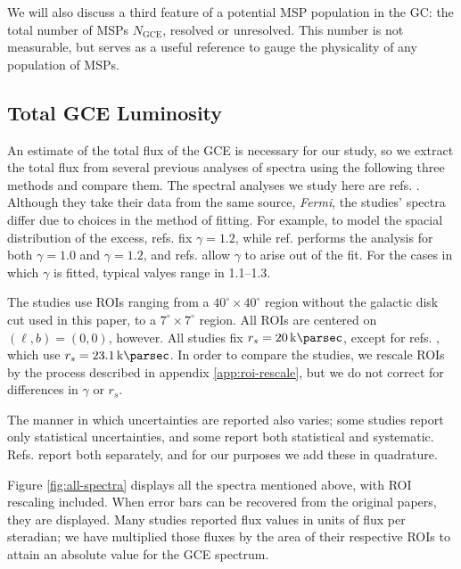 \documentclass[a4paper,11pt]{article}
\newcommand{\comment}[1]{\emph{\color{red}{#1}}}
\begin{document}
We will also discuss a third feature of a potential MSP population in the GC: the total number of MSPs $N_\text{GCE}$, resolved or unresolved. This number is not measurable, but serves as a useful reference to gauge the physicality of any population of MSPs. \comment{Mention that it's expected to be around 40,000.}


\subsection{Total GCE Luminosity}
\label{sec:total-lum}
An estimate of the total flux of the GCE is necessary for our study, so we extract the total flux from several previous analyses of spectra using the following three methods and compare them. The spectral analyses we study here are refs. \cite{Zhong:2019ycb, Calore:2014xka, DiMauro:2021raz, Abazajian:2014fta, Gordon13, Ajello:2015kwa}. Although they take their data from the same source, \textit{Fermi}, the studies' spectra differ due to choices in the method of fitting. For example, to model the spacial distribution of the excess, refs. \cite{Calore:2014xka, Gordon13, Ajello:2015kwa} fix $\gamma=1.2$, while ref. \cite{Zhong:2019ycb} performs the analysis for both $\gamma=1.0$ and $\gamma=1.2$, and refs. \cite{DiMauro:2021raz, Abazajian:2014fta} allow $\gamma$ to arise out of the fit. For the cases in which $\gamma$ is fitted, typical valyes range in 1.1--1.3.

The studies use ROIs ranging from a $40^\circ \times 40^\circ$ region without the galactic disk cut used in this paper, to a $7^\circ \times 7^\circ$ region. All ROIs are centered on $(\ell, b)=(0, 0)$, however. All studies fix $r_s=\SI{20}{\kilo\parsec}$, except for refs. \cite{Abazajian:2014fta, Gordon13}, which use $r_s=\SI{23.1}{\kilo\parsec}$. In order to compare the studies, we rescale ROIs by the process described in appendix \ref{app:roi-rescale}, but we do not correct for differences in $\gamma$ or $r_s$.

The manner in which uncertainties are reported also varies; some studies report only statistical uncertainties, and some report both statistical and systematic. Refs. \cite{Calore:2014xka, Gordon13} report both separately, and for our purposes we add these in quadrature.

Figure \ref{fig:all-spectra} displays all the spectra mentioned above, with ROI rescaling included. When error bars can be recovered from the original papers, they are displayed. Many studies reported flux values in units of flux per steradian; we have multiplied those fluxes by the area of their respective ROIs to attain an absolute value for the GCE spectrum.
\end{document}
